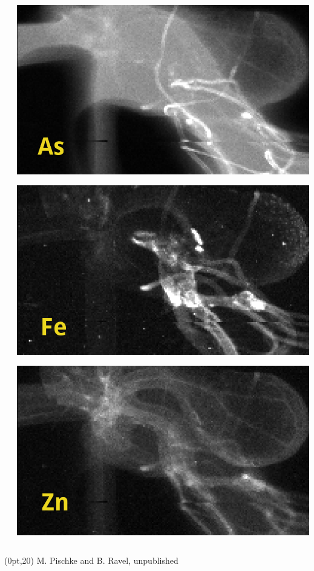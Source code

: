 \documentclass[10pt, xcolor=x11names, compress]{beamer}
\begin{document}
\begin{frame}
\begin{columns}[T]
\begin{column}{0.6\linewidth}
    \end{column}
    \begin{column}{0.4\linewidth}
      \includegraphics[width=\linewidth]{xrf/arabadopsis_as.png}

      \includegraphics[width=\linewidth]{xrf/arabadopsis_fe.png}

      \includegraphics[width=\linewidth]{xrf/arabadopsis_zn.png}
    \end{column}
  \end{columns}
  \begin{textblock*}{0.5\linewidth}(0pt,20\TPVertModule)
    \tiny M. Pischke and B. Ravel, unpublished
  \end{textblock*}
\end{frame}
\end{document}

